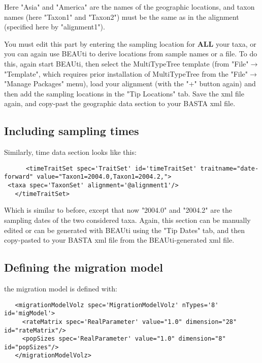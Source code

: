 \documentclass[10pt,letterpaper]{article}
\begin{document}
Here "Asia" and "America" are the names of the geographic locations, and taxon names (here "Taxon1" and "Taxon2") must be the same as in the alignment (specified here by "alignment1").

You must edit this part by entering the sampling location for {\bf{ALL}} your taxa, or you can again use BEAUti to derive locations from sample names or a file. To do this, again start BEAUti, then select the MultiTypeTree template (from "File"$\rightarrow$ "Template", which requires prior installation of MultiTypeTree from the "File"$\rightarrow$"Manage Packages" menu), load your alignment (with the "+" button again) and then add the sampling locations in the "Tip Locations" tab. Save the xml file again, and copy-past the geographic data section to your BASTA xml file.

\subsection{Including sampling times}

Similarly, time data section looks like this:

\begin{lstlisting}
      <timeTraitSet spec='TraitSet' id='timeTraitSet' traitname="date-forward" value="Taxon1=2004.0,Taxon1=2004.2,">   
 <taxa spec='TaxonSet' alignment='@alignment1'/>
   </timeTraitSet>
\end{lstlisting}
   
Which is similar to before, except that now "2004.0" and "2004.2" are the sampling dates of the two considered taxa. Again, this section can be manually edited or can be generated with BEAUti using the "Tip Dates" tab, and then copy-pasted to your BASTA xml file from the BEAUti-generated xml file.

\subsection{Defining the migration model}

the migration model is defined with:

\begin{lstlisting}
   <migrationModelVolz spec='MigrationModelVolz' nTypes='8' id='migModel'>
     <rateMatrix spec='RealParameter' value="1.0" dimension="28" id="rateMatrix"/>
     <popSizes spec='RealParameter' value="1.0" dimension="8" id="popSizes"/>
   </migrationModelVolz>
\end{lstlisting}
\end{document}
